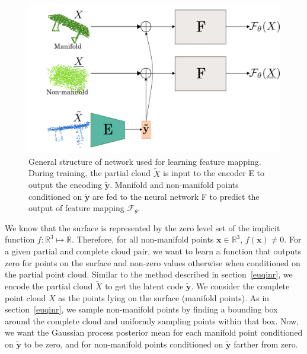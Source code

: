 \begin{figure}[htb]
      \begin{center}
      \includegraphics[width=\linewidth]{figures/gpr_network.png}
      \end{center}
      \caption{General structure of network used for learning feature mapping. During training, the partial cloud $\tilde{X}$ is input to the encoder E to output the encoding $\mathbf{\tilde{y}}$. Manifold and non-manifold points conditioned on $\mathbf{\tilde{y}}$ are fed to the neural network F to predict the output of feature mapping $\mathcal{F}_\theta$.}\label{fig:gpr_net}
\end{figure}

We know that the surface is represented by the zero level set of the implicit function $f: \mathbb{R}^{3} \mapsto \mathbb{R}$. Therefore, for all non-manifold points $\mathbf{x} \in \mathbb{R}^{3}$, $f(\mathbf{x}) \neq 0$. For a given partial and complete cloud pair, we want to learn a function that outputs zero for points on the surface and non-zero values otherwise when conditioned on the partial point cloud. Similar to the method described in section~\ref{euqinr}, we encode the partial cloud $\tilde{X}$ to get the latent code $\mathbf{\tilde{y}}$. We consider the complete point cloud $X$ as the points lying on the surface (manifold points). As in section~\ref{euqinr}, we sample non-manifold points by finding a bounding box around the complete cloud and uniformly sampling points within that box. Now, we want the Gaussian process posterior mean for each manifold point conditioned on $\mathbf{\tilde{y}}$ to be zero, and for non-manifold points conditioned on $\mathbf{\tilde{y}}$ farther from zero.
\newline

